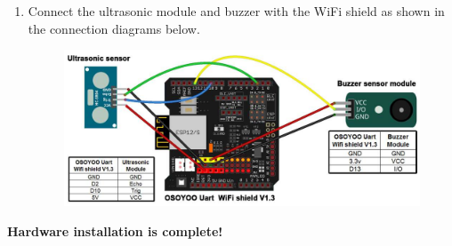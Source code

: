 \documentclass{article}
\begin{document}
\begin{enumerate}
	\item Connect the ultrasonic module and buzzer with the WiFi shield as shown in the connection diagrams below. 
	
	\begin{figure}[H]
		\centering
		\includegraphics[width=0.7\linewidth]{Images/image7}
		\label{fig:image7}
	\end{figure}
	
\end{enumerate}

\textbf{Hardware installation is complete!}
\end{document}
